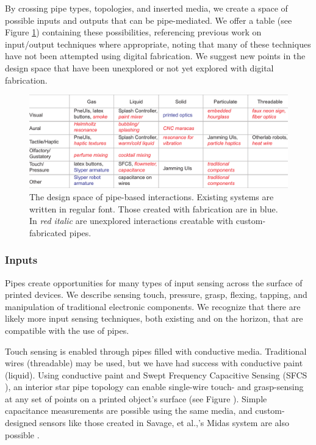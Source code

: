 By crossing pipe types, topologies, and inserted media, we create a space of possible inputs and outputs that can be pipe-mediated.  We offer a table (see Figure \ref{fig:designspace}) containing these possibilities, referencing previous work on input/output techniques where appropriate, noting that many of these techniques have not been attempted using digital fabrication.  We suggest new points in the design space that have been unexplored or not yet explored with digital fabrication.

\begin{figure}[t]
\centering
    \includegraphics[width=\textwidth]{figures/designspace.pdf}
\caption{The design space of pipe-based interactions.  Existing systems are written in regular font.  Those created with fabrication are in {\color{blue}blue}. In \emph{{\color{red}red italic}} are unexplored interactions creatable with custom-fabricated pipes.}
\label{fig:designspace}
\end{figure}

\subsubsection{Inputs}

Pipes create opportunities for many types of input sensing across the surface of printed devices.  We describe sensing touch, pressure, grasp, flexing, tapping, and manipulation of traditional electronic components.  We recognize that there are likely more input sensing techniques, both existing and on the horizon, that are compatible with the use of pipes.

Touch sensing is enabled through pipes filled with conductive media.  Traditional wires (threadable) may be used, but we have had success with conductive paint (liquid).  Using conductive paint and Swept Frequency Capacitive Sensing (SFCS \cite{Sato-touche}), an interior star pipe topology can enable single-wire touch- and grasp-sensing at any set of points on a printed object's surface (see Figure \cite{fig:toy}).  Simple capacitance measurements are possible using the same media, and custom-designed sensors like those created in Savage, et al.,'s Midas system are also possible \cite{Savage-midas}.

